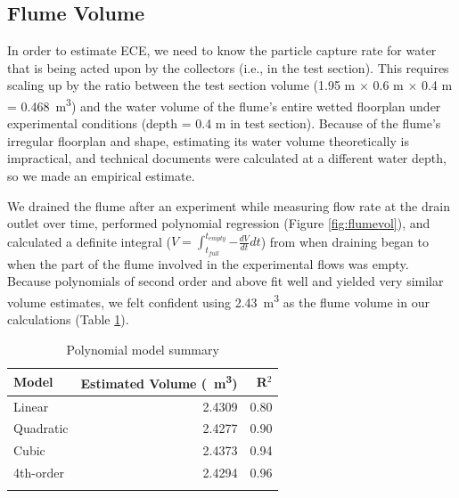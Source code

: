 \documentclass[geosciences,article,submit,moreauthors,pdftex]{Definitions/mdpi}
\begin{document}
\subsection{Flume Volume}

In order to estimate ECE, we need to know the particle capture rate for water that is being acted upon by the collectors (i.e., in the test section). This requires scaling up by the ratio between the test section volume (1.95 m $\times$ 0.6 m $\times$ 0.4 m = \SI{0.468}{m^3}) and the water volume of the flume's entire wetted floorplan under experimental conditions (depth = 0.4 m in test section). Because of the flume's irregular floorplan and shape, estimating its water volume theoretically is impractical, and technical documents were calculated at a different water depth, so we made an empirical estimate. 

We drained the flume after an experiment while measuring flow rate at the drain outlet over time, performed polynomial regression (Figure \ref{fig:flumevol}), and calculated a definite integral ($V = \int_{t_{full}}^{t_{empty}}{-\frac{dV}{dt}dt}$) from when draining began to when the part of the flume involved in the experimental flows was empty. Because polynomials of second order and above fit well and yielded very similar volume estimates, we felt confident using \SI{2.43}{\metre\cubed} as the flume volume in our calculations (Table \ref{tbl:flumevol}).

\begin{table}[H]
\caption{Polynomial model summary}
\centering
\begin{tabular}{lrr}
\toprule
\textbf{Model}&\textbf{Estimated Volume (\SI{}{\metre\cubed})}&\textbf{R$^2$}\\
\midrule
Linear       &  2.4309     &   0.80\\
Quadratic    &  2.4277     &   0.90\\
Cubic        &  2.4373     &   0.94\\
4th-order    &  2.4294     &   0.96\\
\bottomrule
\label{tbl:flumevol}
\end{tabular}
\end{table}
\end{document}
